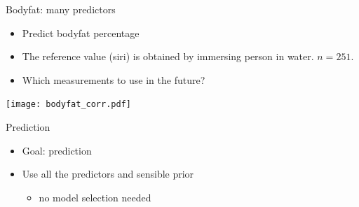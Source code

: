 \documentclass[english,t]{beamer}
\begin{document}

  
  
  

\begin{frame}{Bodyfat: many predictors}

  \vspace{-0.75\baselineskip}
  \begin{itemize}
  \item Predict bodyfat percentage
  \item The reference value (siri) is obtained by
    immersing person in water. $n=251$.
  \item Which measurements to use in the future?
  \end{itemize}
  \pause
  \vspace{-0.7\baselineskip}
  \texttt{[image: bodyfat\_corr.pdf]}

\end{frame}

\begin{frame}{Prediction}

  \begin{itemize}
  \item Goal: prediction
  \item<2-> Use all the predictors and sensible prior
    \begin{itemize}
    \item<3-> no model selection needed
    \end{itemize}
  \end{itemize}

\end{frame}
\end{document}

